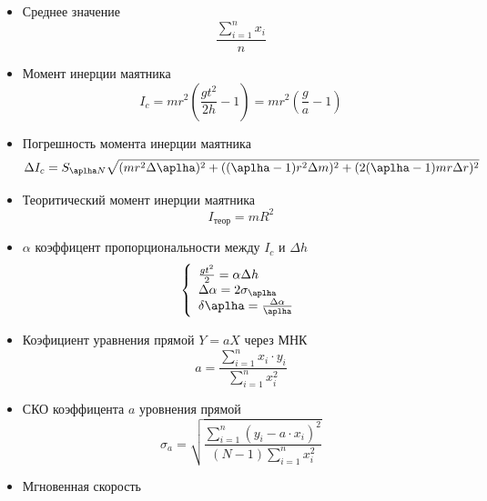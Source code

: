 \documentclass[a4paper]{article}
\begin{document}
\begin{itemize}
    \item Среднее значение 
    \begin{equation}
                \frac{\sum_{i=1}^n x_i}{n}
                \label{average}
            \end{equation}
    \item Момент инерции маятника 
    \begin{equation}
        I_c = mr^2(\frac{gt^2}{2h}-1) = m r^2(\frac{g}{a}-1)
        \label{Ic}
    \end{equation}
    \item Погрешность момента инерции маятника 
    \begin{equation}
        \Delta I_c = S_{\aplha N}\sqrt{(m r^2\Delta \aplha)^2 + ((\aplha - 1)r^2\Delta m)^2 + (2(\aplha-1)m r\Delta r)^2}
        \label{IcPogr}
    \end{equation}
    \item Теоритический момент инерции маятника
    \begin{equation}
        I_{теор} = m R^2
        \label{Ict}
    \end{equation}
    \item  $\alpha$ коэффицент пропорциональности между $I_c$ и $\Delta h$
    \begin{equation}
    \left\{
        \begin{array}{l}
            \frac{gt^2}{2} = \alpha \Delta h\\
            \Delta \alpha = 2\sigma_\aplha\\
            \delta \aplha = \frac{\Delta \alpha}{\aplha}\\
        \end{array}
        \right.
        \label{alpha}
    \end{equation}
    \item Коэфициент уравнения прямой $Y = aX$ через МНК 
        \begin{equation}
            a = \frac{\sum_{i=1}^n x_i\cdot y_i}{\sum_{i=1}^n x^2_i}
            \label{lineMNK}
        \end{equation}
    \item СКО коэффицента $a$ уровнения прямой
    \begin{equation}
           \sigma_a = \sqrt{\frac{\sum_{i=1}^n (y_i - a\cdot x_i)^2}{(N-1)\sum_{i=1}^n x^2_i}}
        \label{MNKpogr}
    \end{equation}
    \item Мгновенная скорость 

\end{itemize}
\end{document}
